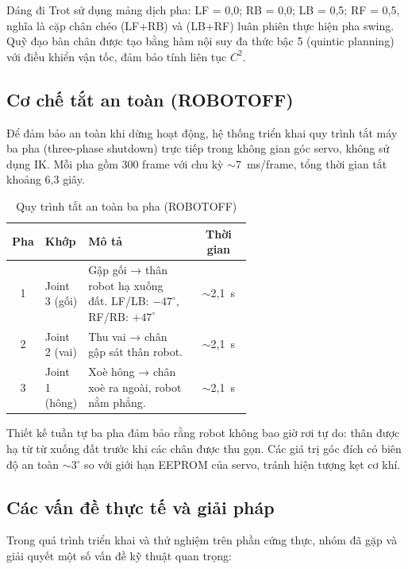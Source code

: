 Dáng đi Trot sử dụng mảng dịch pha: LF = 0,0; RB = 0,0; LB = 0,5; RF = 0,5, nghĩa là cặp chân chéo (LF+RB) và (LB+RF) luân phiên thực hiện pha swing. Quỹ đạo bàn chân được tạo bằng hàm nội suy đa thức bậc 5 (quintic planning) với điều khiển vận tốc, đảm bảo tính liên tục $C^2$.

\subsection{Cơ chế tắt an toàn (ROBOTOFF)}

Để đảm bảo an toàn khi dừng hoạt động, hệ thống triển khai quy trình tắt máy ba pha (three-phase shutdown) trực tiếp trong không gian góc servo, không sử dụng IK. Mỗi pha gồm 300 frame với chu kỳ $\sim$7~ms/frame, tổng thời gian tắt khoảng 6,3 giây.

\begin{table}[H]
\centering
\caption{Quy trình tắt an toàn ba pha (ROBOTOFF)}
\label{tab:robotoff}
\renewcommand{\arraystretch}{1.4}
\begin{tabular}{|c|p{0.15\linewidth}|p{0.45\linewidth}|c|}
\hline
\textbf{Pha} & \textbf{Khớp} & \textbf{Mô tả} & \textbf{Thời gian} \\ \hline
1 & Joint 3 (gối) & Gập gối → thân robot hạ xuống đất. LF/LB: $-47^\circ$, RF/RB: $+47^\circ$ & $\sim$2,1~s \\ \hline
2 & Joint 2 (vai) & Thu vai → chân gập sát thân robot. & $\sim$2,1~s \\ \hline
3 & Joint 1 (hông) & Xoè hông → chân xoè ra ngoài, robot nằm phẳng. & $\sim$2,1~s \\ \hline
\end{tabular}
\end{table}

Thiết kế tuần tự ba pha đảm bảo rằng robot không bao giờ rơi tự do: thân được hạ từ từ xuống đất trước khi các chân được thu gọn. Các giá trị góc đích có biên độ an toàn $\sim$3$^\circ$ so với giới hạn EEPROM của servo, tránh hiện tượng kẹt cơ khí.

\subsection{Các vấn đề thực tế và giải pháp}

Trong quá trình triển khai và thử nghiệm trên phần cứng thực, nhóm đã gặp và giải quyết một số vấn đề kỹ thuật quan trọng:

